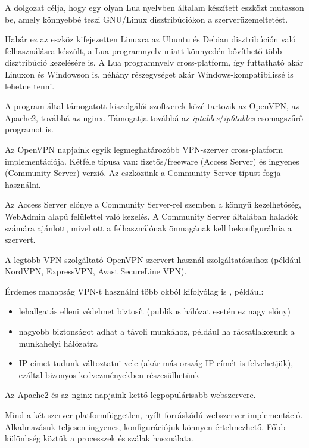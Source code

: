 
A dolgozat célja, hogy egy olyan Lua nyelvben általam készített eszközt mutasson be, amely könnyebbé teszi GNU/Linux disztribúciókon a szerverüzemeltetést.

Habár ez az eszköz kifejezetten Linuxra az Ubuntu és Debian disztribúción való felhasználásra készült, a Lua programnyelv miatt könnyedén bővíthető több disztribúció kezelésére is. A Lua programnyelv cross-platform, így futtatható akár Linuxon és Windowson is, néhány részegységet akár Windows-kompatibilissé is lehetne tenni.

A program által támogatott kiszolgálói szoftverek közé tartozik az OpenVPN, az Apache2, továbbá az nginx. Támogatja továbbá az \textit{iptables}/\textit{ip6tables} csomagszűrő programot is.

\medskip

Az OpenVPN napjaink egyik legmeghatározóbb VPN-szerver cross-platform implementációja. Kétféle típusa van: fizetős/freeware (Access Server) és ingyenes (Community Server) verzió. Az eszközünk a Community Server típust fogja használni.

Az Access Server előnye a Community Server-rel szemben a könnyű kezelhetőség, WebAdmin alapú felülettel való kezelés. 
A Community Server általában haladók számára ajánlott, mivel ott a felhasználónak önmagának kell bekonfigurálnia a szervert.

A legtöbb VPN-szolgáltató OpenVPN szervert használ szolgáltatásaihoz (például NordVPN, ExpressVPN, Avast SecureLine VPN). \cite{whatisopenvpn}

Érdemes manapság VPN-t használni több okból kifolyólag is \cite{usageofvpn}, például:
\begin{itemize}
  \item lehallgatás elleni védelmet biztosít (publikus hálózat esetén ez nagy előny)
  \item nagyobb biztonságot adhat a távoli munkához, például ha rácsatlakozunk a munkahelyi hálózatra
  \item IP címet tudunk változtatni vele (akár más ország IP címét is felvehetjük), ezáltal bizonyos kedvezményekben részesülhetünk
\end{itemize}

\medskip
Az Apache2 és az nginx napjaink kettő legpopulárisabb webszervere. \cite{webservermarketshare}

Mind a két szerver platformfüggetlen, nyílt forráskódú webszerver implementáció. Alkalmazásuk teljesen ingyenes, konfigurációjuk könnyen értelmezhető. Főbb különbség köztük a processzek és szálak használata.

